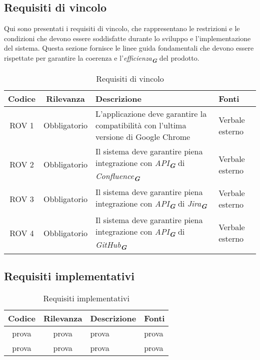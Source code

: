 \subsection{Requisiti di vincolo}
Qui sono presentati i requisiti di vincolo, che rappresentano le restrizioni e le condizioni
che devono essere soddisfatte durante lo sviluppo e l'implementazione del sistema. Questa
sezione fornisce le linee guida fondamentali che devono essere rispettate per garantire la
coerenza e l'\emph{efficienza}\textsubscript{\textit{\textbf{G}}} del prodotto.
\begin{table}[h!]
    \centering
    \renewcommand{\arraystretch}{1.6} %
    \begin{tabularx}{\textwidth}{|>{\centering\arraybackslash}c|>{\centering\arraybackslash}c|>{\centering\arraybackslash}X|>{\centering\arraybackslash}p{3cm}|} \hline
    \rowcolor[HTML]{FFD700} 
    \textbf{Codice} & \textbf{Rilevanza} & \textbf{Descrizione} & \textbf{Fonti} \\ \hline
    ROV 1 & Obbligatorio & L'applicazione deve garantire la compatibilità con l'ultima versione di Google Chrome & Verbale esterno \\ \hline
    ROV 2 & Obbligatorio & Il sistema deve garantire piena integrazione con \emph{API}\textsubscript{\textit{\textbf{G}}} di \emph{Confluence}\textsubscript{\textit{\textbf{G}}} & Verbale esterno \\ \hline
    ROV 3 & Obbligatorio & Il sistema deve garantire piena integrazione con \emph{API}\textsubscript{\textit{\textbf{G}}} di \emph{Jira}\textsubscript{\textit{\textbf{G}}} & Verbale esterno\\ \hline
    ROV 4 & Obbligatorio & Il sistema deve garantire piena integrazione con \emph{API}\textsubscript{\textit{\textbf{G}}} di \emph{GitHub}\textsubscript{\textit{\textbf{G}}} & Verbale esterno \\ \hline
    \end{tabularx}
    \caption{Requisiti di vincolo}
    \label{tab:Requisiti_di_vincolo}
\end{table}

\newpage
\subsection{Requisiti implementativi}
\label{sec:Requisiti_implementativi}
\begin{table}[h!]
    \centering
    \renewcommand{\arraystretch}{1.6} %
    \begin{tabularx}{\textwidth}{|>{\centering\arraybackslash}c|>{\centering\arraybackslash}c|>{\centering\arraybackslash}X|>{\centering\arraybackslash}p{3cm}|} \hline
    \rowcolor[HTML]{FFD700} 
    \textbf{Codice} & \textbf{Rilevanza} & \textbf{Descrizione} & \textbf{Fonti} \\ \hline
    prova & prova & prova & prova \\ \hline
    prova & prova & prova & prova \\ \hline
    \end{tabularx}
    \caption{Requisiti implementativi}
    \label{tab:Requisiti_implementativi}
\end{table}

